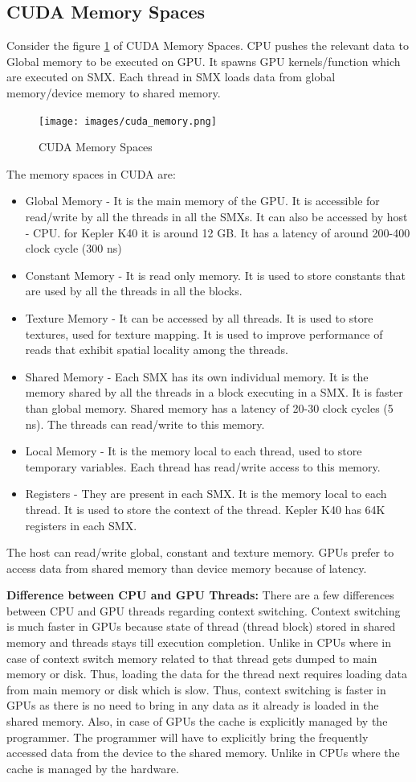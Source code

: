 \documentclass[12pt]{book}
\begin{document}
\subsection{CUDA Memory Spaces}
Consider the figure \ref{fig:cuda_memory} of CUDA Memory Spaces. CPU pushes the relevant data to Global memory to be executed on GPU.
It spawns GPU kernels/function which are executed on SMX. Each thread in SMX loads data from global memory/device memory to shared memory.
\begin{figure}[H]
    \centering
    \texttt{[image: images/cuda\_memory.png]}
    \caption{CUDA Memory Spaces}
    \label{fig:cuda_memory}
\end{figure}
The memory spaces in CUDA are:
\begin{itemize}
    \item Global Memory - It is the main memory of the GPU. It is accessible for read/write by all the threads in all the SMXs. 
    It can also be accessed by host - CPU. for Kepler K40 it is around 12 GB. It has a latency of around 200-400 clock cycle (300 ns)
    \item Constant Memory - It is read only memory. It is used to store constants that are used by all the threads in all the blocks.
    \item Texture Memory - It can be accessed by all threads. It is used to store textures, used for texture mapping. It is used to improve performance of reads that exhibit spatial locality among the threads.
    \item Shared Memory - Each SMX has its own individual memory. It is the memory shared by all the threads in a block executing in a SMX. It is faster than global memory. Shared memory has a latency of 20-30 clock cycles (5 ns). The threads can read/write to this memory.
    \item Local Memory - It is the memory local to each thread, used to store temporary variables. Each thread has read/write access to this memory.
    \item Registers - They are present in each SMX. It is the memory local to each thread. It is used to store the context of the thread. Kepler K40 has 64K registers in each SMX.
\end{itemize}
The host can read/write global, constant and texture memory. GPUs prefer to access data from shared memory than device memory because of latency.

\textbf{Difference between CPU and GPU Threads: }There are a few differences between CPU and GPU threads regarding context switching.
Context switching is much faster in GPUs because state of thread (thread block) stored in shared memory and threads stays till execution completion. Unlike in CPUs
where in case of context switch memory related to that thread gets dumped to main memory or disk. Thus, loading the data for the thread next requires loading data from main memory or disk which is 
slow. Thus, context switching is faster in GPUs as there is no need to bring in any data as it already is loaded in the shared memory. Also, in case
of GPUs the cache is explicitly managed by the programmer. The programmer will have to explicitly bring the frequently accessed data from the device to the shared memory. Unlike
in CPUs where the cache is managed by the hardware.
\end{document}

